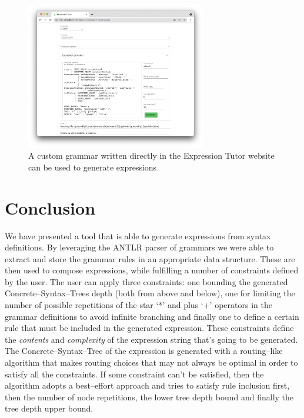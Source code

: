 \documentclass[]{usiinfbachelorproject}
\begin{document}
\begin{figure}[ht]
\centering
\includegraphics[width=0.7\textwidth]{img/validation/web_tutor_step4.png}
\caption{A custom grammar written directly in the Expression Tutor website
can be used to generate expressions
}\label{validation-web-4}
\end{figure}

\newpage

\section{Conclusion}\label{conclusion}


We have presented a tool that is able to generate expressions from syntax
definitions.
By leveraging the ANTLR parser of grammars we were able to extract and store
the grammar rules in an appropriate data structure. These are then used to
compose expressions, while fulfilling a number of constraints defined by the
user. The user can apply three constraints: one bounding the generated
Concrete–Syntax–Trees depth (both from above and below), one for limiting
the number of possible repetitions of the star `*' and plus `+' operators in
the grammar definitions to avoid infinite branching and finally one to define
a certain rule that must be included in the generated expression.
These constraints define the \textit{contents} and \textit{complexity} of
the expression string that's going to be generated. The Concrete–Syntax–Tree of
the expression is generated with a routing–like algorithm that makes routing
choices that may not always be optimal in order to satisfy all the constraints.
If some constraint can't be satisfied, then the algorithm adopts a best–effort
approach and tries to satisfy rule inclusion first, then the number of
node repetitions, the lower tree depth bound and finally the tree depth upper
bound.
\end{document}
